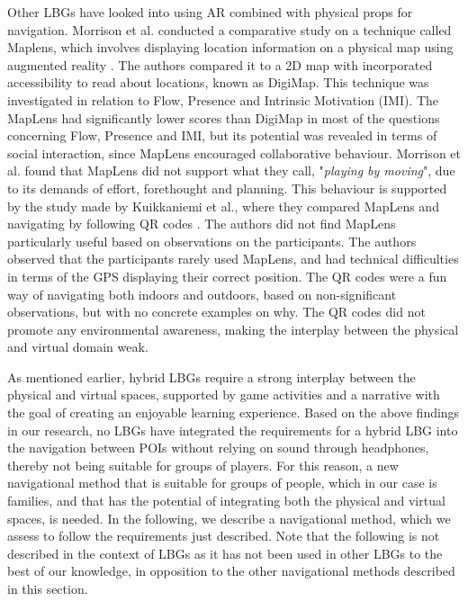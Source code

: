 Other LBGs have looked into using AR combined with physical props for navigation. Morrison et al. conducted a comparative study on a technique called Maplens, which involves displaying location information on a physical map using augmented reality \cite{Morrison}. The authors compared it to a 2D map with incorporated accessibility to read about locations, known as DigiMap. This technique was investigated in relation to Flow, Presence and Intrinsic Motivation (IMI). The MapLens had significantly lower scores than DigiMap in most of the questions concerning Flow, Presence and IMI, but its potential was revealed in terms of social interaction, since MapLens encouraged collaborative behaviour.  Morrison et al. found that MapLens did not support what they call, "\textit{playing by moving}", due to its demands of effort, forethought and planning. This behaviour is supported by the study made by Kuikkaniemi et al., where they compared MapLens and navigating by following QR codes \cite{LostLab}. The authors did not find MapLens particularly useful based on observations on the participants. The authors observed that the participants rarely used MapLens, and had technical difficulties in terms of the GPS displaying their correct position. The QR codes were a fun way of navigating both indoors and outdoors, based on non-significant observations, but with no concrete examples on why. The QR codes did not promote any environmental awareness, making the interplay between the physical and virtual domain weak. 

As mentioned earlier, hybrid LBGs require a strong interplay between the physical and virtual spaces, supported by game activities and a narrative with the goal of creating an enjoyable learning experience. Based on the above findings in our research, no LBGs have integrated the requirements for a hybrid LBG into the navigation between POIs without relying on sound through headphones, thereby not being suitable for groups of players. For this reason, a new navigational method that is suitable for groups of people, which in our case is families, and that has the potential of integrating both the physical and virtual spaces, is needed. In the following, we describe a navigational method, which we assess to follow the requirements just described. Note that the following is not described in the context of LBGs as it has not been used in other LBGs to the best of our knowledge, in opposition to the other navigational methods described in this section.

